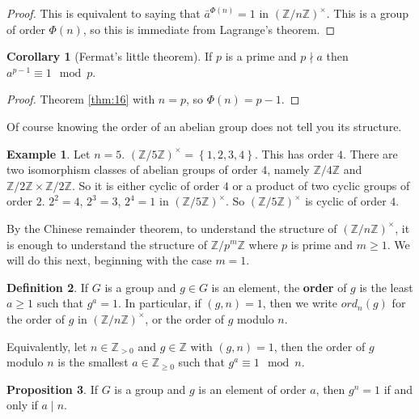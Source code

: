 \documentclass{article}
\newcommand{\Z}{\mathbb{Z}}
\newcommand{\rb}[1]{\left( #1 \right)}
\newcommand{\cb}[1]{\left\{ #1 \right\}}
\newcommand{\unit}[1]{\rb{\Z / #1\Z}^\times}
\theoremstyle{definition}\newtheorem{definition}{Definition}
\theoremstyle{definition}\newtheorem*{remark}{Remark}
\theoremstyle{definition}\newtheorem*{example}{Example}
\theoremstyle{definition}\newtheorem*{note}{Note}
\newtheorem{proposition}[definition]{Proposition}
\newtheorem{corollary}[definition]{Corollary}
\begin{document}
\begin{proof}
This is equivalent to saying that $ \bar{a}^{\Phi\rb{n}} = 1 $ in $ \unit{n} $. This is a group of order $ \Phi\rb{n} $, so this is immediate from Lagrange's theorem.
\end{proof}

\begin{corollary}[Fermat's little theorem]
If $ p $ is a prime and $ p \nmid a $ then $ a^{p - 1} \equiv 1 \mod p $.
\end{corollary}

\begin{proof}
Theorem \ref{thm:16} with $ n = p $, so $ \Phi\rb{n} = p - 1 $.
\end{proof}

Of course knowing the order of an abelian group does not tell you its structure.

\begin{example}
Let $ n = 5 $. $ \unit{5} = \cb{1, 2, 3, 4} $. This has order $ 4 $. There are two isomorphism classes of abelian groups of order $ 4 $, namely $ \Z / 4\Z $ and $ \Z / 2\Z \times \Z / 2\Z $. So it is either cyclic of order $ 4 $ or a product of two cyclic groups of order $ 2 $. $ 2^2 = 4 $, $ 2^3 = 3 $, $ 2^4 = 1 $ in $ \unit{5} $. So $ \unit{5} $ is cyclic of order $ 4 $.
\end{example}

By the Chinese remainder theorem, to understand the structure of $ \unit{n} $, it is enough to understand the structure of $ \Z / p^m\Z $ where $ p $ is prime and $ m \ge 1 $. We will do this next, beginning with the case $ m = 1 $.


\begin{definition}
If $ G $ is a group and $ g \in G $ is an element, the \textbf{order} of $ g $ is the least $ a \ge 1 $ such that $ g^a = 1 $. In particular, if $ \rb{g, n} = 1 $, then we write $ ord_n\rb{g} $ for the order of $ g $ in $ \unit{n} $, or the order of $ g $ modulo $ n $.
\end{definition}

Equivalently, let $ n \in \Z_{> 0} $ and $ g \in \Z $ with $ \rb{g, n} = 1 $, then the order of $ g $ modulo $ n $ is the smallest $ a \in \Z_{\ge 0} $ such that $ g^a \equiv 1 \mod n $.

\begin{proposition}
\label{prop:19}
If $ G $ is a group and $ g $ is an element of order $ a $, then $ g^n = 1 $ if and only if $ a \mid n $.
\end{proposition}
\end{document}
